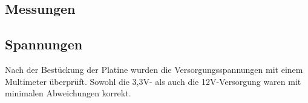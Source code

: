 \begin{inhalt}
\section{Messungen}
	\subsection{Spannungen}

    Nach der Bestückung der Platine wurden die Versorgungsspannungen mit einem Multimeter überprüft. Sowohl die 3,3V- als auch die 12V-Versorgung waren mit minimalen Abweichungen korrekt.

\end{inhalt}